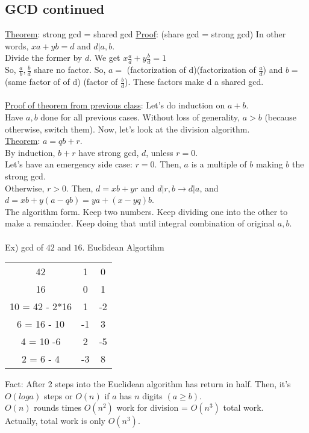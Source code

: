 \documentclass[13pt]{article}
\begin{document}
	\subsection*{GCD continued}
		\underline{Theorem}: strong gcd = shared gcd
		\underline{Proof}: (share gcd = strong gcd) In other words, $xa + yb = d$
		and $d | a, b$. \\
		Divide the former by $d$. We get $x\frac{a}{d} + y\frac{b}{d} = 1$\\
		So, $\frac{a}{b}, \frac{b}{d}$ share no factor. So, $a = $ (factorization
		of d)(factorization of $\frac{a}{d}$) and $b = $ (same factor of of d)
		(factor of $\frac{b}{d}$). These factors make d a shared gcd.\\\\
		\underline{Proof of theorem from previous class}: Let's do induction on
		$a + b$. \\
		Have $a,b$ done for all previous cases. Without loss of generality, 
		$a > b$ (because otherwise, switch them). Now, let's look at the
		division algorithm.\\
		\underline{Theorem}: $a = qb + r$.\\
		By induction, $b+r$ have strong gcd, $d$, unless $r = 0$. \\
		Let's have an
		emergency side case: $r = 0$. Then, $a$ is a multiple of $b$ making $b$
		the strong gcd.\\
		Otherwise, $r > 0$. Then, $d = xb + yr$ and $d|r,b \rightarrow d|a$,
		and $d = xb + y(a - qb) = ya + (x-yq)b$.\\
		The algorithm form. Keep two numbers. Keep dividing one into the other 
		to make a remainder. Keep doing that until integral combination of
		original $a,b$.\\\\
		Ex) gcd of $42$ and $16$. Euclidean Algortihm
		\begin{center}
			\begin{tabular}{c || c | c}
				42 & 1 & 0 \\
				16 & 0 & 1 \\
				10 = 42 - 2*16 & 1  & -2 \\
				6 = 16 - 10 & -1 & 3 \\
				4 = 10 -6 & 2 & -5 \\
				2 = 6 - 4 & -3 & 8 \\
			\end{tabular}
		\end{center}
		Fact: After 2 steps into the Euclidean algorithm has return in half.
		Then, it's $O(log a)$ steps or $O(n)$ if $a$ has $n$ digits $(a \ge b)$.\\
		$O(n)$ rounds times $O(n^2)$ work for division = $O(n^3)$ total work.\\
		Actually, total work is only $O(n^3)$.
\end{document}
